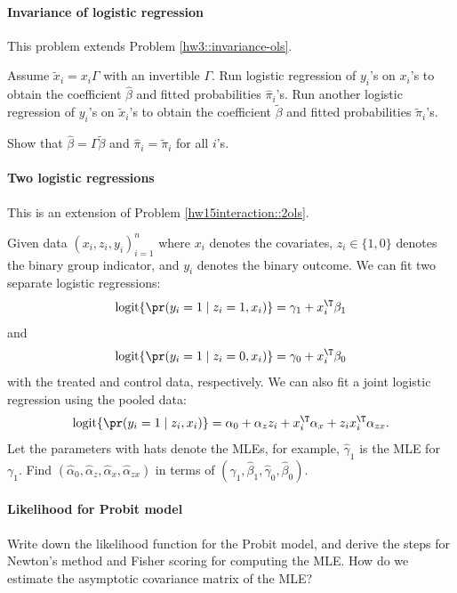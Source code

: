 \paragraph{Invariance of logistic regression}
\label{hw17::invariance-logistic}

This problem extends Problem \ref{hw3::invariance-ols}. 

Assume $\tilde{x}_i = x_i \Gamma$ with an invertible $\Gamma$. Run logistic regression of $y_i$'s on $x_i$'s to obtain the coefficient $\hat\beta$ and fitted probabilities $\hat\pi_i$'s. Run another logistic regression of $y_i$'s on $\tilde x_i$'s to obtain the coefficient $\tilde \beta$ and fitted probabilities $\tilde\pi_i$'s.

Show that $\hat\beta = \Gamma \tilde \beta$ and $\hat\pi_i = \tilde\pi_i$ for all $i$'s. 


 


\paragraph{Two logistic regressions}\label{hw17::2logistic}

This is an extension of Problem \ref{hw15interaction::2ols}. 

Given data $(x_i, z_i, y_i)_{i=1}^n$ where $x_i$ denotes the covariates, $z_i \in \{1,0 \}$ denotes the binary group indicator, and $y_i$ denotes the binary outcome. We can fit two separate logistic regressions:
$$
\text{logit}\{  \pr(y_i=1\mid z_i =1, x_i) \}=  \gamma_1 + x_i^{\T} \beta_1
$$
and
$$
\text{logit}\{  \pr(y_i=1\mid z_i =0, x_i) \}=  \gamma_0 + x_i^{\T} \beta_0
$$
with the treated and control data, respectively. We can also fit a joint logistic regression using the pooled data:
$$
\text{logit}\{  \pr(y_i=1\mid z_i , x_i) \} = \alpha_0 + \alpha_z z_i + x_i^{\T} \alpha_x  +  z_i x_i^{\T} \alpha_{zx}.
$$
Let the parameters with hats denote the MLEs, for example, $\hat{\gamma}_1$ is the MLE for $\gamma_1$. Find $(\hat{\alpha}_0, \hat{\alpha}_z, \hat{\alpha}_x, \hat{\alpha}_{zx})$ in terms of $ (  \hat{\gamma}_1, \hat{\beta}_1, \hat{\gamma}_0, \hat{\beta}_0 ).$

 

\paragraph{Likelihood for Probit model}\label{hw17::probit-mle}

Write down the likelihood function for the Probit model, and derive the
steps for Newton's method and Fisher scoring for computing the MLE. How do we estimate the asymptotic covariance matrix of the MLE?



